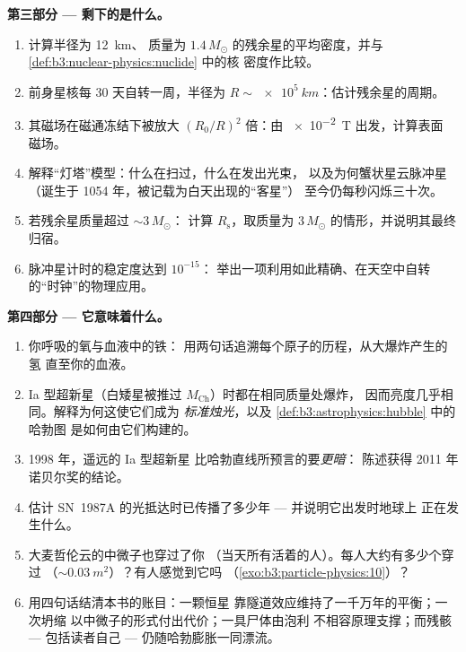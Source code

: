 \begin{problem}
\medskip\noindent\textbf{第三部分 --- 剩下的是什么。}

\begin{enumerate}[resume]
  \item 计算半径为 \qty{12}{km}、
        质量为 $1.4\,M_\odot$ 的残余星的平均密度，并与
        \cref{def:b3:nuclear-physics:nuclide} 中的核
        密度作比较。
  \item 前身星核每 30 天自转一周，半径为
        $R \sim \qty{e5}{km}$：估计残余星的周期。
  \item 其磁场在磁通冻结下被放大
        $(R_0/R)^2$ 倍：由 \qty{e-2}{T} 出发，计算表面
        磁场。
  \item 解释“灯塔”模型：什么在扫过，什么在发出光束，
        以及为何蟹状星云脉冲星（诞生于 1054 年，被记载为白天出现的“客星”）
        至今仍每秒闪烁三十次。
  \item 若残余星质量超过 ${\sim}3\,M_\odot$：
        计算 $R_{\text{s}}$，取质量为 $3\,M_\odot$ 的情形，并说明其最终归宿。
  \item 脉冲星计时的稳定度达到 $10^{-15}$：
        举出一项利用如此精确、在天空中自转的“时钟”的物理应用。
\end{enumerate}

\medskip\noindent\textbf{第四部分 --- 它意味着什么。}

\begin{enumerate}[resume]
  \item 你呼吸的氧与血液中的铁：
        用两句话追溯每个原子的历程，从大爆炸产生的氢
        直至你的血液。
  \item Ia 型超新星（白矮星被推过
        $M_{\text{Ch}}$）时都在相同质量处爆炸，
        因而亮度几乎相同。解释为何这使它们成为
        \emph{标准烛光}，以及
        \cref{def:b3:astrophysics:hubble} 中的哈勃图
        是如何由它们构建的。
  \item 1998 年，遥远的 Ia 型超新星
        比哈勃直线所预言的要\emph{更暗}：
        陈述获得 2011 年诺贝尔奖的结论。
  \item 估计 SN~1987A 的光抵达时已传播了多少年
        --- 并说明它出发时地球上
        正在发生什么。
  \item 大麦哲伦云的中微子也穿过了你
        （当天所有活着的人）。每人大约有多少个穿过
        （${\sim}\qty{0.03}{m^2}$）？有人感觉到它吗
        （\cref{exo:b3:particle-physics:10}）？
  \item 用四句话结清本书的账目：一颗恒星
        靠隧道效应维持了一千万年的平衡；一次坍缩
        以中微子的形式付出代价；一具尸体由泡利
        不相容原理支撑；而残骸 --- 包括读者自己 ---
        仍随哈勃膨胀一同漂流。
\end{enumerate}
\end{problem}
